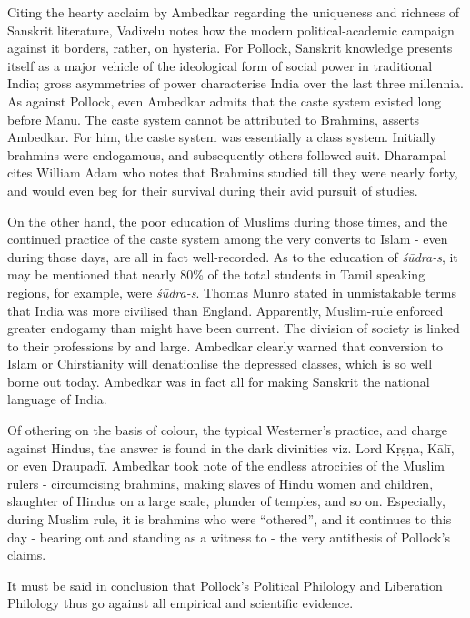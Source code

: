 \vspace {.15cm}

Citing the hearty acclaim by Ambedkar regarding the uniqueness and richness of Sanskrit literature, Vadivelu notes how the modern political-academic campaign against it borders, rather, on hysteria. For Pollock, Sanskrit knowledge presents itself as a major vehicle of the ideological form of social power in traditional India; gross asymmetries of power characterise India over the last three millennia. As against Pollock, even Ambedkar admits that the caste system existed long before Manu. The caste system cannot be attributed to Brahmins, asserts Ambedkar. For him, the caste system was essentially a class system. Initially brahmins were endogamous, and subsequently others followed suit. Dharampal cites William Adam who notes that Brahmins studied till they were nearly forty, and would even beg for their survival during their avid pursuit of studies.

\vspace {.15cm}

On the other hand, the poor education of Muslims during those times, and the continued practice of the caste system among the very converts to Islam - even during those days, are all in fact well-recorded. As to the education of \textit{śūdra-s}, it may be mentioned that nearly 80\% of the total students in Tamil speaking regions, for example, were \textit{śūdra-s}. Thomas Munro stated in unmistakable terms that India was more civilised than England. Apparently, Muslim-rule enforced greater endogamy than might have been current. The division of society is linked to their professions by and large. Ambedkar clearly warned that conversion to Islam or Chirstianity will denationlise the depressed classes, which is so well borne out today. Ambedkar was in fact all for making Sanskrit the national language of India.

\vspace {.15cm}

Of othering on the basis of colour, the typical Westerner’s practice, and charge against Hindus, the answer is found in the dark divinities viz. Lord Kṛṣṇa, Kālī, or even Draupadī. Ambedkar took note of the endless atrocities of the Muslim rulers - circumcising brahmins, making slaves of Hindu women and children, slaughter of Hindus on a large scale, plunder of temples, and so on. Especially, during Muslim rule, it is brahmins who were “othered”, and it continues to this day - bearing out and standing as a witness to - the very antithesis of Pollock’s claims.

It must be said in conclusion that Pollock’s Political Philology and Liberation Philology thus go against all empirical and scientific evidence.

